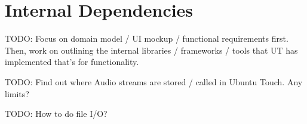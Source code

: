 \section{Internal Dependencies}

TODO: Focus on domain model / UI mockup / functional requirements first. Then, work on outlining the internal libraries / frameworks / tools that UT has implemented that's for functionality.


TODO: Find out where Audio streams are stored / called in Ubuntu Touch. Any limits?

TODO: How to do file I/O?

